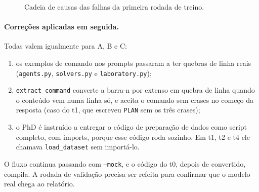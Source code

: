 \documentclass[11pt,a4paper]{article}
\begin{document}
\begin{figure}[H]
\centering
{}
\caption{Cadeia de causas das falhas da primeira rodada de treino.}
\label{fig:falha}
\end{figure}

\paragraph{Correções aplicadas em seguida.} Todas valem igualmente para A, B e C:
\begin{enumerate}
  \item os exemplos de comando nos prompts passaram a ter quebras de linha reais
        (\texttt{agents.py}, \texttt{solvers.py} e \texttt{laboratory.py});
  \item \texttt{extract\_command} converte a barra-n por extenso em quebra de linha quando o
        conteúdo vem numa linha só, e aceita o comando sem crases no começo da resposta
        (caso do t1, que escreveu \texttt{PLAN} sem os três crases);
  \item o PhD é instruído a entregar o código de preparação de dados como script completo,
        com imports, porque esse código roda sozinho. Em t1, t2 e t4 ele chamava
        \texttt{load\_dataset} sem importá-lo.
\end{enumerate}
O fluxo continua passando com \texttt{--mock}, e o código do t0, depois de convertido, compila.
A rodada de validação precisa ser refeita para confirmar que o modelo real chega ao
relatório.
\end{document}
